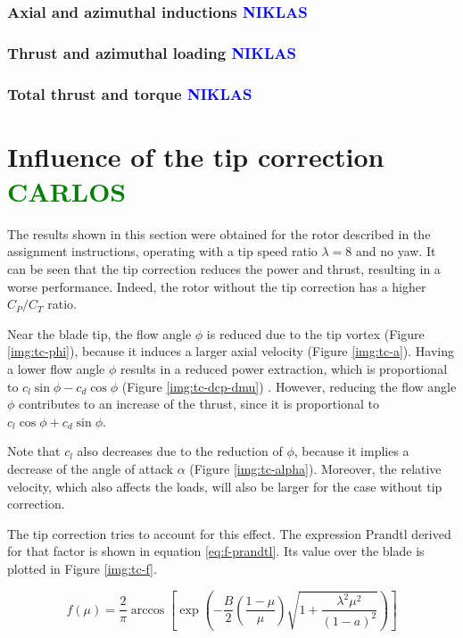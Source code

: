 \subsubsection{Axial and azimuthal inductions \textcolor{blue}{NIKLAS}}

\subsubsection{Thrust and azimuthal loading \textcolor{blue}{NIKLAS}}

\subsubsection{Total thrust and torque \textcolor{blue}{NIKLAS}}

\section{Influence of the tip correction \textcolor{green}{CARLOS}}

The results shown in this section were obtained for the rotor described in the assignment instructions, operating with a tip speed ratio $ \lambda = 8 $ and no yaw. It can be seen that the tip correction reduces the power and thrust, resulting in a worse performance. Indeed, the rotor without the tip correction has a higher $ C_P/C_T $ ratio.

Near the blade tip, the flow angle $ \phi $ is reduced due to the tip vortex (Figure \ref{img:tc-phi}), because it induces a larger axial velocity (Figure \ref{img:tc-a}). Having a lower flow angle $ \phi $ results in a reduced power extraction, which is proportional to $ c_l \sin \phi - c_d \cos \phi $ (Figure \ref{img:tc-dcp-dmu}) \cite{weh-ch3}. However, reducing the flow angle $ \phi $ contributes to an increase of the thrust, since it is proportional to $ c_l \cos \phi + c_d \sin \phi $.

Note that $ c_l $ also decreases due to the reduction of $ \phi $, because it implies a decrease of the angle of attack $ \alpha $ (Figure \ref{img:tc-alpha}). Moreover, the relative velocity, which also affects the loads, will also be larger for the case without tip correction.

The tip correction tries to account for this effect. The expression Prandtl derived for that factor is shown in equation \ref{eq:f-prandtl}. Its value over the blade is plotted in Figure \ref{img:tc-f}.

\begin{equation}
f(\mu) = \frac{2}{\pi} \arccos \left[ \exp \left( - \frac{B}{2} \left( \frac{1-\mu}{\mu} \right) \sqrt{1+\frac{\lambda^2\mu^2}{(1-a)^2}} \right) \right]
\label{eq:f-prandtl}
\end{equation}

